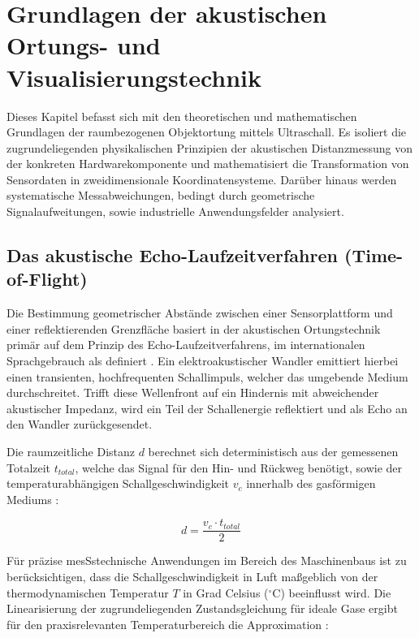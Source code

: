 %
%
%


\chapter{Grundlagen der akustischen Ortungs- und Visualisierungstechnik}
\label{chap:Domain_Knowledge_Application}

Dieses Kapitel befasst sich mit den theoretischen und mathematischen Grundlagen der raumbezogenen Objektortung mittels Ultraschall. Es isoliert die zugrundeliegenden physikalischen Prinzipien der akustischen Distanzmessung von der konkreten Hardwarekomponente und mathematisiert die Transformation von Sensordaten in zweidimensionale Koordinatensysteme. Darüber hinaus werden systematische Messabweichungen, bedingt durch geometrische Signalaufweitungen, sowie industrielle Anwendungsfelder analysiert.

\section{Das akustische Echo-Laufzeitverfahren (Time-of-Flight)}
\label{sec:Time_of_Flight_Theorie}

Die Bestimmung geometrischer Abstände zwischen einer Sensorplattform und einer reflektierenden Grenzfläche basiert in der akustischen Ortungstechnik primär auf dem Prinzip des Echo-Laufzeitverfahrens, im internationalen Sprachgebrauch als  definiert \cite{Lerch:2012}. Ein elektroakustischer Wandler emittiert hierbei einen transienten, hochfrequenten Schallimpuls, welcher das umgebende Medium durchschreitet. Trifft diese Wellenfront auf ein Hindernis mit abweichender akustischer Impedanz, wird ein Teil der Schallenergie reflektiert und als Echo an den Wandler zurückgesendet.

Die raumzeitliche Distanz $d$ berechnet sich deterministisch aus der gemessenen Totalzeit $t_{total}$, welche das Signal für den Hin- und Rückweg benötigt, sowie der temperaturabhängigen Schallgeschwindigkeit $v_c$ innerhalb des gasförmigen Mediums \cite{Fraden:2010}:

\begin{equation}
	d = \frac{v_c \cdot t_{total}}{2}
\end{equation}

Für präzise mesSstechnische Anwendungen im Bereich des Maschinenbaus ist zu berücksichtigen, dass die Schallgeschwindigkeit in Luft ma\ss geblich von der thermodynamischen Temperatur $T$ in Grad Celsius ($^\circ$C) beeinflusst wird. Die Linearisierung der zugrundeliegenden Zustandsgleichung für ideale Gase ergibt für den praxisrelevanten Temperaturbereich die Approximation \cite{Lerch:2012}:

